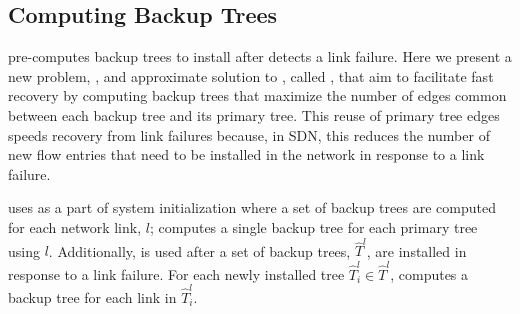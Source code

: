 \subsection{Computing Backup Trees}
\label{subsec:min-control}

\mdr pre-computes backup trees to install after \pcnt detects a link failure.  Here we present a new problem, \mcs, and approximate solution to \mcs, called \steiners, that aim to facilitate fast
recovery by computing backup trees that maximize the number of edges common between each backup tree and its primary tree.  This reuse of primary tree edges speeds recovery from link
failures because, in SDN, this reduces the number of new flow entries that need to be installed in the network in response to a link failure.

\mdr uses \steiner as a part of system initialization where a set of backup trees are computed for each network link, $l$; \mdr computes a single backup tree for each primary tree using $l$. 
Additionally, \steiner is used after a set of backup trees, $\hat{T}^l$, are installed in response to a link failure.  For each newly installed tree $\hat{T}^l_i \in \hat{T}^l$, \mdr computes 
a backup tree for each link in $\hat{T}^l_i$.



